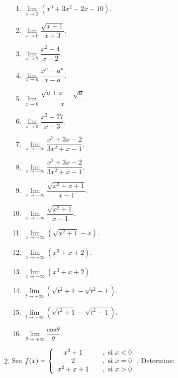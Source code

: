 \begin{enumerate}
\begin{enumerate}
\item $\lim\limits_{x\rightarrow2}(x^{3}+3x^{2}-2x-10)$.

\item $\lim\limits_{x\rightarrow0}\dfrac{\sqrt{x+1}}{x+3}$.

\item $\lim\limits_{x\rightarrow2}\dfrac{x^{2}-4}{x-2}$.

\item $\lim\limits_{x\rightarrow a}\dfrac{x^{n}-a^{n}}{x-a}$.

\item $\lim\limits_{x\rightarrow0}\dfrac{\sqrt{a+x}-\sqrt{a}}{x}$.

\item $\lim\limits_{x\rightarrow3}\dfrac{x^{3}-27}{x-3}$.

\item $\lim\limits_{x\rightarrow+\infty}\dfrac{x^{2}+3x-2}{3x^{2}+x-1}$.

\item $\lim\limits_{x\rightarrow-\infty}\dfrac{x^{2}+3x-2}{3x^{2}+x-1}$.

\item $\lim\limits_{x\rightarrow+\infty}\dfrac{\sqrt{x^{2}+x+1}}{x-1}$.

\item $\lim\limits_{x\rightarrow-\infty}\dfrac{\sqrt{x^{2}+1}}{x-1}$.

\item $\lim\limits_{x\rightarrow+\infty}(\sqrt{x^{2}+1}-x)$.

\item $\lim\limits_{x\rightarrow+\infty}(x^{3}+x+2)$.

\item $\lim\limits_{x\rightarrow-\infty}(x^{3}+x+2)$.

\item $\lim\limits_{t\rightarrow+\infty}(\sqrt{t^{2}+1}-\sqrt{t^{2}-1})$.

\item $\lim\limits_{t\rightarrow-\infty}(\sqrt{t^{2}+1}-\sqrt{t^{2}-1})$.

\item $\lim\limits_{\theta\rightarrow+\infty}\dfrac{cos\theta}{\theta}$.
\end{enumerate}

\item Sea $f(x)=\left\{
\begin{array}
[c]{ccc}%
x^{3}+1 &  & ,\text{ si }x<0\\
2 &  & ,\text{ si }x=0\\
x^{2}+x+1 &  & ,\text{ si }x>0
\end{array}
\right.  $. Determine:


\end{enumerate}
